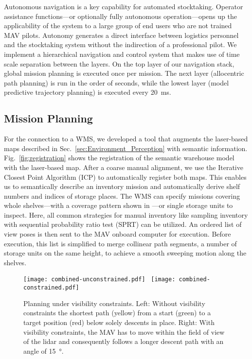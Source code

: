 Autonomous navigation is a key capability for automated stocktaking.
Operator assistance functions---or optionally fully autonomous operation---opens up the applicability of the system to a large group of end users who are not trained MAV pilots. Autonomy generates a direct interface between logistics personnel and the stocktaking system without the indirection of a professional pilot.
We implement a hierarchical navigation and control system that makes use of time scale separation between the layers. On the top layer of our navigation stack, global mission planning is executed once per mission. The next layer (allocentric path planning) is run in the order of seconds, while the lowest layer (model predictive trajectory planning) is executed every \SI{20}{\milli\second}.

\subsection{Mission Planning}
\label{sec:Mission_Planning}
For the connection to a WMS, we developed a tool that augments the laser-based maps described in Sec.~\ref{sec:Environment_Perception} with semantic information.
Fig.~\ref{fig:registration} shows the registration of the semantic warehouse model with the laser-based map. After a coarse manual alignment, we use the Iterative Closest Point Algorithm (ICP) to automatically register both maps.
This enables us to semantically describe an inventory mission and automatically derive shelf numbers and indices of storage places.
The WMS can specify missions covering whole shelves---with a coverage pattern shown in ---or single storage units to inspect.
Here, all common strategies for manual inventory like \eg sampling inventory with sequential probability ratio test (SPRT) can be utilized.
An ordered list of view poses is then sent to the MAV onboard computer for execution.
Before execution, this list is simplified to merge collinear path segments, \eg a number of storage units on the same height, to achieve a smooth sweeping motion along the shelves.

\begin{figure}[t]
  \centering
  \texttt{[image: combined-unconstrained.pdf]}~
  \texttt{[image: combined-constrained.pdf]}%
  \vspace{-1ex}
  \caption{Planning under visibility constraints. Left: Without visibility constraints the shortest path (yellow) from a start (green) to a target position (red) below solely descents in place. Right: With visibility constraints, the MAV has to move within the field of view of the lidar and consequently follows a longer descent path with an angle of \SI{15}{\degree}.}
  \label{fig:constrained_planning}
  \vspace{-2ex}
\end{figure}

